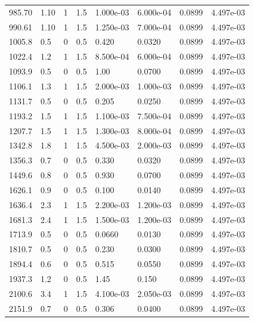 \documentclass[preview]{standalone}
\begin{document}
{{\begin{tabular}{L{1.2cm}C{1.2cm} C{0.3cm}C{0.5cm} C{1.4cm}C{1.4cm} C{1.4cm}C{1.4cm}}
  985.70  &  1.10  & 1     & 1.5 &  1.000e-03  & 6.000e-04  & 0.0899 &  4.497e-03   \\ 
  990.61  &  1.10  & 1     & 1.5 &  1.250e-03  & 7.000e-04  & 0.0899 &  4.497e-03   \\ 
  1005.8  &   0.5  & 0     & 0.5 &  0.420  & 0.0320  & 0.0899 &  4.497e-03   \\ 
  1022.4  &   1.2  & 1     & 1.5 &  8.500e-04  & 6.000e-04  & 0.0899 &  4.497e-03   \\ 
  1093.9  &   0.5  & 0     & 0.5 &  1.00  & 0.0700  & 0.0899 &  4.497e-03   \\ 
  1106.1  &   1.3  & 1     & 1.5 &  2.000e-03  & 1.000e-03  & 0.0899 &  4.497e-03   \\ 
  1131.7  &   0.5  & 0     & 0.5 &  0.205  & 0.0250  & 0.0899 &  4.497e-03   \\ 
  1193.2  &   1.5  & 1     & 1.5 &  1.100e-03  & 7.500e-04  & 0.0899 &  4.497e-03   \\ 
  1207.7  &   1.5  & 1     & 1.5 &  1.300e-03  & 8.000e-04  & 0.0899 &  4.497e-03   \\ 
  1342.8  &   1.8  & 1     & 1.5 &  4.500e-03  & 2.000e-03  & 0.0899 &  4.497e-03   \\ 
  1356.3  &   0.7  & 0     & 0.5 &  0.330  & 0.0320  & 0.0899 &  4.497e-03   \\ 
  1449.6  &   0.8  & 0     & 0.5 &  0.930  & 0.0700  & 0.0899 &  4.497e-03   \\ 
  1626.1  &   0.9  & 0     & 0.5 &  0.100  & 0.0140  & 0.0899 &  4.497e-03   \\ 
  1636.4  &   2.3  & 1     & 1.5 &  2.200e-03  & 1.200e-03  & 0.0899 &  4.497e-03   \\ 
  1681.3  &   2.4  & 1     & 1.5 &  1.500e-03  & 1.200e-03  & 0.0899 &  4.497e-03   \\ 
  1713.9  &   0.5  & 0     & 0.5 &  0.0660  & 0.0130  & 0.0899 &  4.497e-03   \\ 
  1810.7  &   0.5  & 0     & 0.5 &  0.230  & 0.0300  & 0.0899 &  4.497e-03   \\ 
  1894.4  &   0.6  & 0     & 0.5 &  0.515  & 0.0550  & 0.0899 &  4.497e-03   \\ 
  1937.3  &   1.2  & 0     & 0.5 &  1.45  & 0.150  & 0.0899 &  4.497e-03   \\ 
  2100.6  &   3.4  & 1     & 1.5 &  4.100e-03  & 2.050e-03  & 0.0899 &  4.497e-03   \\ 
  2151.9  &   0.7  & 0     & 0.5 &  0.306  & 0.0400  & 0.0899 &  4.497e-03   \\ 

\end{tabular}}}
\end{document}

